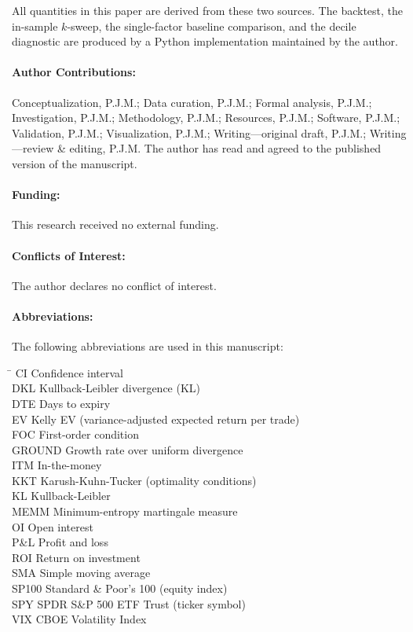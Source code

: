 \documentclass[11pt]{article}
\theoremstyle{definition}
\theoremstyle{remark}
\begin{document}
All quantities in this paper are derived from these two sources. The
backtest, the in-sample $k$-sweep, the single-factor baseline
comparison, and the decile diagnostic are produced by a Python
implementation maintained by the author.

\paragraph{Author Contributions:}
Conceptualization, P.J.M.; Data curation, P.J.M.; Formal analysis,
P.J.M.; Investigation, P.J.M.; Methodology, P.J.M.; Resources,
P.J.M.; Software, P.J.M.; Validation, P.J.M.; Visualization, P.J.M.;
Writing---original draft, P.J.M.; Writing---review \& editing,
P.J.M. The author has read and agreed to the published version of
the manuscript.

\paragraph{Funding:}
This research received no external funding.

\paragraph{Conflicts of Interest:}
The author declares no conflict of interest.

\paragraph{Abbreviations:}
The following abbreviations are used in this manuscript:

\medskip
\begin{tabbing}
\hspace{2.5cm}\=\kill
CI       \> Confidence interval \\
DKL      \> Kullback-Leibler divergence (KL) \\
DTE      \> Days to expiry \\
EV       \> Kelly EV (variance-adjusted expected return per trade) \\
FOC      \> First-order condition \\
GROUND   \> Growth rate over uniform divergence \\
ITM      \> In-the-money \\
KKT      \> Karush-Kuhn-Tucker (optimality conditions) \\
KL       \> Kullback-Leibler \\
MEMM     \> Minimum-entropy martingale measure \\
OI       \> Open interest \\
P\&L     \> Profit and loss \\
ROI      \> Return on investment \\
SMA      \> Simple moving average \\
SP100    \> Standard \& Poor's 100 (equity index) \\
SPY      \> SPDR S\&P 500 ETF Trust (ticker symbol) \\
VIX      \> CBOE Volatility Index \\
\end{tabbing}
\end{document}
